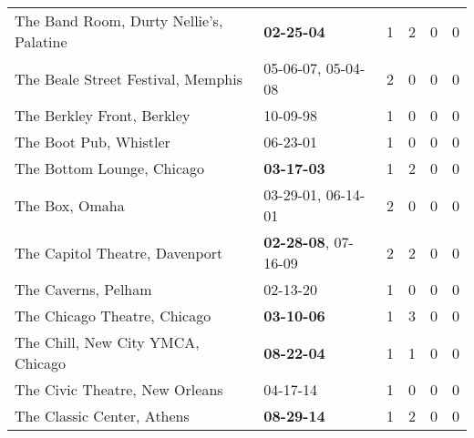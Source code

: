 \begin{longtable}{p{}p{}p{}p{}p{}p{}}
                                      The Band Room, Durty Nellie's, Palatine &                                       \textbf{02-25-04\textsuperscript{}} &  1 &  2 &  0 &  0 \\
                                           The Beale Street Festival, Memphis &                    05-06-07\textsuperscript{}, 05-04-08\textsuperscript{} &  2 &  0 &  0 &  0 \\
                                                   The Berkley Front, Berkley &                                                10-09-98\textsuperscript{} &  1 &  0 &  0 &  0 \\
                                                       The Boot Pub, Whistler &                                                06-23-01\textsuperscript{} &  1 &  0 &  0 &  0 \\
                                                   The Bottom Lounge, Chicago &                                       \textbf{03-17-03\textsuperscript{}} &  1 &  2 &  0 &  0 \\
                                                               The Box, Omaha &                    03-29-01\textsuperscript{}, 06-14-01\textsuperscript{} &  2 &  0 &  0 &  0 \\
                                               The Capitol Theatre, Davenport &           \textbf{02-28-08\textsuperscript{}}, 07-16-09\textsuperscript{} &  2 &  2 &  0 &  0 \\
                                                          The Caverns, Pelham &                                                02-13-20\textsuperscript{} &  1 &  0 &  0 &  0 \\
                                                 The Chicago Theatre, Chicago &                                       \textbf{03-10-06\textsuperscript{}} &  1 &  3 &  0 &  0 \\
                                            The Chill, New City YMCA, Chicago &                                       \textbf{08-22-04\textsuperscript{}} &  1 &  1 &  0 &  0 \\
                                               The Civic Theatre, New Orleans &                                                04-17-14\textsuperscript{} &  1 &  0 &  0 &  0 \\
                                                   The Classic Center, Athens &                                       \textbf{08-29-14\textsuperscript{}} &  1 &  2 &  0 &  0 \\

\end{longtable}
